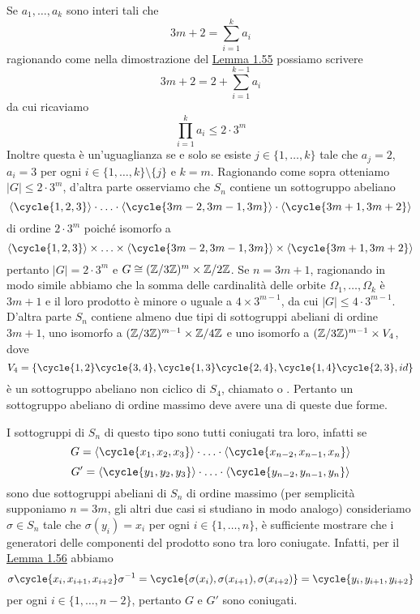 \documentclass[11pt]{scrartcl}
\begin{document}
\begin{remark}
    Se $a_1, \ldots, a_k$ sono interi tali che 
    \[
        3m + 2 = \sum_{i = 1}^k a_i
    \]
    ragionando come nella dimostrazione del \hyperref[lemma1.55]{Lemma 1.55}
    possiamo scrivere
    \[
        3m + 2 = 2 + \sum_{i = 1}^{k - 1}a_i
    \]
    da cui ricaviamo
    \[
        \prod_{i = 1}^k a_i \leqslant 2\cdot3^m
    \]
    Inoltre questa è un'uguaglianza se e solo se esiste $j \in \{1, \ldots, k\}$
    tale che $a_j = 2$, $a_i = 3$ per ogni $i \in \{1, \ldots, k\}\setminus\{j\}$
    e $k = m$. Ragionando come sopra otteniamo $|G| \leqslant 2\cdot 3^m$, 
    d'altra parte osserviamo che $S_n$ contiene un sottogruppo abeliano
    \[
        \langle\cycle{1, 2, 3}\rangle\cdot\ldots\cdot\langle\cycle{3m - 2, 3m - 1, 3m}\rangle\cdot\langle\cycle{3m + 1, 3m + 2}\rangle
    \]
    di ordine $2\cdot3^m$ poiché isomorfo a 
    \[
        \langle\cycle{1, 2, 3}\rangle\times\ldots\times\langle\cycle{3m - 2, 3m - 1, 3m}\rangle\times\langle\cycle{3m + 1, 3m + 2}\rangle
    \]
    pertanto $|G| = 2\cdot3^m$ e $G \cong (\mathbb{Z}/{3}\mathbb{Z})^m \times \mathbb{Z}/{2}\mathbb{Z}$.
    Se $n = 3m + 1$, ragionando in modo simile abbiamo che la somma delle
    cardinalità delle orbite $\Omega_1, \ldots, \Omega_k$ è $3m + 1$ e il 
    loro prodotto è minore o uguale a $4\times 3^{m - 1}$, da cui $|G| \leq
    4\cdot3^{m - 1}$. D'altra parte $S_n$ contiene almeno due tipi di 
    sottogruppi abeliani di ordine $3m + 1$, uno isomorfo a 
    $(\mathbb{Z}/{3}\mathbb{Z})^{m - 1} \times \mathbb{Z}/{4}\mathbb{Z}$ e uno isomorfo a $(\mathbb{Z}/{3}\mathbb{Z})^{m - 1}\times V_4$,
    dove 
    \[
        V_4 = \{\cycle{1, 2}\cycle{3, 4}, \cycle{1, 3}\cycle{2, 4}, 
    \cycle{1, 4}\cycle{2, 3}, id\}
    \]
    è un sottogruppo abeliano non ciclico di $S_4$, chiamato 
     o . Pertanto un sottogruppo
    abeliano di ordine massimo deve avere una di queste due forme.
\end{remark}

\begin{remark}
    I sottogruppi di $S_n$ di questo tipo sono tutti coniugati tra loro, infatti
    se 
    \[
        G = \langle\cycle{x_1, x_2, x_3}\rangle\cdot\ldots\cdot\langle\cycle{x_{n - 2}, x_{n - 1}, x_n}\rangle
    \]
    \[
        G' = \langle\cycle{y_1, y_2, y_3}\rangle\cdot\ldots\cdot\langle\cycle{y_{n - 2}, y_{n - 1}, y_n}\rangle
    \]
    sono due sottogruppi abeliani di $S_n$ di ordine massimo (per semplicità
    supponiamo $n = 3m$, gli altri due casi si studiano in modo analogo)
    consideriamo $\sigma \in S_n$ tale che $\sigma(y_i) = x_i$ per ogni 
    $i \in \{1, \ldots, n\}$, è sufficiente mostrare che i generatori delle componenti del
    prodotto sono tra loro coniugate. Infatti, per il \hyperref[lemma1.56]{Lemma 1.56}
    abbiamo 
    \[
        \sigma\cycle{x_i, x_{i + 1}, x_{i + 2}}\sigma^{-1} = 
        \cycle{\sigma(x_i), \sigma(x_{i + 1}), \sigma(x_{i + 2})} = 
        \cycle{y_i, y_{i + 1}, y_{i + 2}}
    \]
    per ogni $i \in \{1, \ldots, n - 2\}$, pertanto $G$ e $G'$ sono coniugati.
\end{remark}
\end{document}
